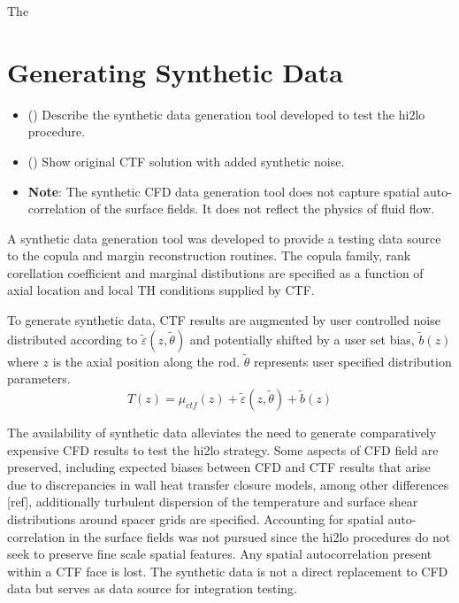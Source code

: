 
The 

\section{Generating Synthetic Data}

\begin{itemize}
    \item (\checkmark) Describe the synthetic data generation tool developed to test the hi2lo procedure.
    \item (\checkmark) Show original CTF solution with added synthetic noise.
    \item \textbf{Note}: The synthetic CFD data generation tool does not capture spatial auto-correlation of the surface fields.  It does not reflect
        the physics of fluid flow.
\end{itemize}

A synthetic data generation tool was developed to provide a testing data source to the copula and margin reconstruction routines.  The copula family, rank corellation coefficient and marginal distibutions are specified as a function of axial location and local TH conditions supplied by CTF.

To generate synthetic data, CTF results are augmented by user controlled noise distributed according to
    $\tilde \varepsilon(z, \tilde \theta)$
    and potentially shifted by a user set bias,
    $\tilde b(z)$ where $z$ is the axial position along the rod.
    $\tilde \theta$ represents user specified distribution parameters.
    \begin{equation}
        T(z) = \mu_{ctf}(z) + \tilde \varepsilon (z, \tilde \theta) + \tilde b(z)
    \end{equation}


The availability of synthetic data alleviates the need to generate comparatively expensive CFD results to test the hi2lo strategy.  Some aspects of CFD field are preserved, including expected biases between CFD and CTF results that arise due to discrepancies in wall heat transfer closure models, among other differences [ref], additionally turbulent dispersion of the temperature and surface shear distributions around spacer grids are specified.  Accounting for spatial auto-correlation in the surface fields was not pursued since the hi2lo procedures do not seek to preserve fine scale spatial features.  Any spatial autocorrelation present within a CTF face is lost.  The synthetic data is not a direct replacement to CFD data but serves as data source for integration testing.

